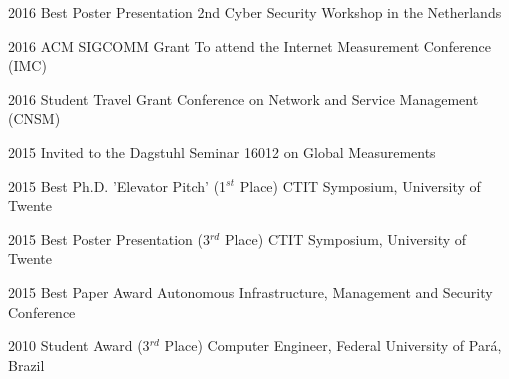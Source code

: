 \documentclass[print]{styles/friggeri-cv-mac} %
\begin{document}
\begin{entrylist}

\vspace{-0.3cm}
\entry
{2016}
{Best Poster Presentation}
{2nd Cyber Security Workshop in the Netherlands}

\vspace{-0.3cm}
\entry
{2016}
{ACM SIGCOMM Grant}
{To attend the Internet Measurement Conference (IMC)}

\vspace{-0.3cm}
\entry
{2016}
{Student Travel Grant}
{Conference on Network and Service Management (CNSM)}

\vspace{-0.3cm}
\entry
{2015}
{Invited to the Dagstuhl Seminar 16012}
{on Global Measurements}

\vspace{-0.3cm}
\entry
{2015}
{Best Ph.D. 'Elevator Pitch' (1$^{st}$ Place)}
{CTIT Symposium, University of Twente}

\vspace{-0.3cm}
\entry
{2015}
{Best Poster Presentation (3$^{rd}$ Place)}
{CTIT Symposium, University of Twente}

\vspace{-0.3cm}
\entry
{2015}
{Best Paper Award}
{Autonomous Infrastructure, Management and Security Conference}


\vspace{-0.3cm}
\entry
{2010}
{Student Award (3$^{rd}$ Place)}
{Computer Engineer, Federal University of Pará, Brazil}

\end{entrylist}

\end{document}
